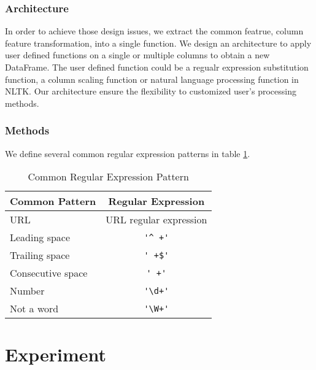 \documentclass[sigconf]{acmart}
\begin{document}
\subsubsection{Architecture}
In order to achieve those design issues, we extract the common featrue, column feature transformation, into a single function. We design an architecture to apply user defined functions on a single or multiple columns to obtain a new DataFrame. The user defined function could be a regualr expression substitution function, a column scaling function or natural language processing function in NLTK. Our architecture ensure the flexibility to customized user's processing methods.

\subsubsection{Methods}
We define several common regular expression patterns in table \ref{tab:reg}.
\begin{table}
\caption{Common Regular Expression Pattern}   
\label{tab:reg}
\begin{tabular}{lc}
	Common Pattern & Regular Expression \\
\hline
	URL & URL regular expression\cite{url} \\
	Leading space & \verb!'^ +'! \\
	Trailing space & \verb!' +$'! \\
	Consecutive space & \verb!' +'! \\
	Number & \verb!'\d+'!  \\
	Not a word & \verb!'\W+'! \\
\end{tabular}   
\end{table}


\section{Experiment}
\end{document}
